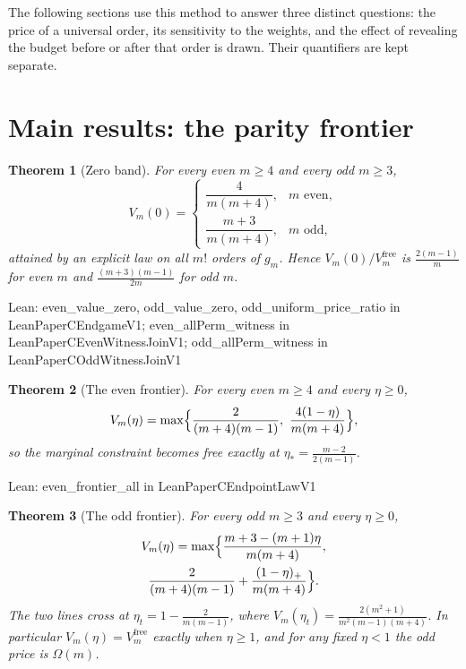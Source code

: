 \documentclass[conference]{IEEEtran}
\newtheorem{theorem}{Theorem}
\theoremstyle{definition}
\newcommand{\lean}[1]{\textsf{\footnotesize #1}}
\newcommand{\leanbox}[1]{%
  \par\vspace{2pt}\noindent
  {\raggedright\footnotesize\textsf{Lean: #1}\par}\vspace{2pt}}
\begin{document}
The following sections use this method to answer three distinct questions: the price of a
universal order, its sensitivity to the weights, and the effect of revealing the budget
before or after that order is drawn. Their quantifiers are kept separate.

\section{Main results: the parity frontier}
\label{sec:frontier}

\begin{theorem}[Zero band]
\label{thm:zero}
For every even $m\ge4$ and every odd $m\ge3$,
\[
V_{m}(0)=
\begin{cases}
\dfrac{4}{m(m+4)}, & m\text{ even},\\[8pt]
\dfrac{m+3}{m(m+4)}, & m\text{ odd},
\end{cases}
\]
attained by an explicit law on all $m!$ orders of $g_{m}$. Hence
$V_{m}(0)/V^{\mathrm{free}}_{m}$ is $\frac{2(m-1)}{m}$ for even $m$ and
$\frac{(m+3)(m-1)}{2m}$ for odd $m$.
\end{theorem}

\leanbox{\lean{even\_value\_zero}, \lean{odd\_value\_zero}, \lean{odd\_uniform\_price\_ratio}
in \lean{LeanPaperCEndgameV1}; \lean{even\_allPerm\_witness} in \lean{LeanPaperCEvenWitnessJoinV1};
\lean{odd\_allPerm\_witness} in \lean{LeanPaperCOddWitnessJoinV1}}

\begin{theorem}[The even frontier]
\label{thm:even}
For every even $m\ge4$ and every $\eta\ge0$,
\[
V_{m}(\eta)=\max\Bigl\{\frac{2}{(m+4)(m-1)},\ \frac{4(1-\eta)}{m(m+4)}\Bigr\},
\]
so the marginal constraint becomes free exactly at $\eta_{*}=\frac{m-2}{2(m-1)}$.
\end{theorem}

\leanbox{\lean{even\_frontier\_all} in \lean{LeanPaperCEndpointLawV1}}

\begin{theorem}[The odd frontier]
\label{thm:odd}
For every odd $m\ge3$ and every $\eta\ge0$,
\begin{multline*}
V_{m}(\eta)=\max\Bigl\{\frac{m+3-(m+1)\eta}{m(m+4)},\\
\frac{2}{(m+4)(m-1)}+\frac{(1-\eta)_{+}}{m(m+4)}\Bigr\}.
\end{multline*}
The two lines cross at $\eta_{t}=1-\frac{2}{m(m-1)}$, where
$V_{m}(\eta_{t})=\frac{2(m^{2}+1)}{m^{2}(m-1)(m+4)}$. In particular
$V_{m}(\eta)=V^{\mathrm{free}}_{m}$ exactly when $\eta\ge1$, and for any fixed $\eta<1$ the
odd price is $\Omega(m)$.
\end{theorem}
\end{document}
